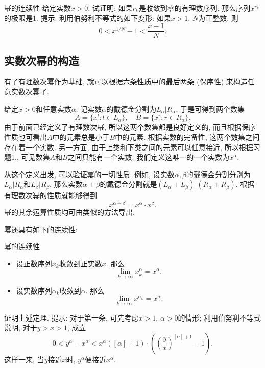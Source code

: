 \begin{exercise}{幂的连续性}
给定实数$x>0$. 试证明: 如果$r_k$是收敛到零的有理数序列, 那么序列$x^{r_k}$的极限是1. 提示: 利用伯努利不等式的如下变形: 如果$x>1$, $N$为正整数, 则
\[
0<x^{1/N}-1<\frac{x-1}{N}.
\]
\end{exercise}

\subsection{实数次幂的构造}
有了有理数次幂作为基础, 就可以根据六条性质中的最后两条 (保序性) 来构造任意实数次幂了. 

给定$x>0$和任意实数$\alpha$. 记实数$\alpha$的戴德金分割为$L_\alpha|R_\alpha$. 于是可得到两个数集
\[
A=\{x^l:l\in L_\alpha\},\quad B=\{x^r:r\in R_\alpha\}.
\]
由于前面已经定义了有理数次幂, 所以这两个数集都是良好定义的, 而且根据保序性质也可看出$A$中的元素总是小于$B$中的元素. 根据实数的完备性, 这两个数集之间存在着一个实数. 另一方面, 由于上类和下类之间的元素可以任意接近, 所以根据习题1., 可见数集$A$和$B$之间只能有一个实数. 我们定义这唯一的一个实数为$x^\alpha$.

从这个定义出发, 可以验证幂的一切性质. 例如, 设实数$\alpha,\beta$的戴德金分割分别为$L_\alpha|R_\alpha$和$L_\beta|R_\beta$, 那么实数$\alpha+\beta$的戴德金分割就是$(L_\alpha+L_\beta)|(R_\alpha+R_\beta)$. 根据有理数次幂的性质就能够得到
\[
x^{\alpha+\beta}=x^\alpha\cdot x^\beta.
\]
幂的其余运算性质均可由类似的方法导出.

幂还具有如下的连续性:

\begin{theorem}{幂的连续性}
\begin{itemize}
\item 设正数序列$x_k$收敛到正实数$x$. 那么
\[
\lim_{k\to\infty}x_k^\alpha=x^\alpha.
\]
\item 设实数序列$\alpha_k$收敛到$\alpha$. 那么
\[
\lim_{k\to\infty}x^{\alpha_k}=x^\alpha.
\]
\end{itemize}
\end{theorem}

\begin{exercise}{}
证明上述定理. 提示: 对于第一条, 可先考虑$x>1$, $\alpha>0$的情形; 利用伯努利不等式说明, 对于$y>x>1$, 成立
\[
0<y^\alpha-x^\alpha<x^\alpha([\alpha]+1)\cdot\left(\left(\frac{y}{x}\right)^{[\alpha]+1}-1\right).
\]
这样一来, 当$y$接近$x$时, $y^\alpha$便接近$x^\alpha$.
\end{exercise}
